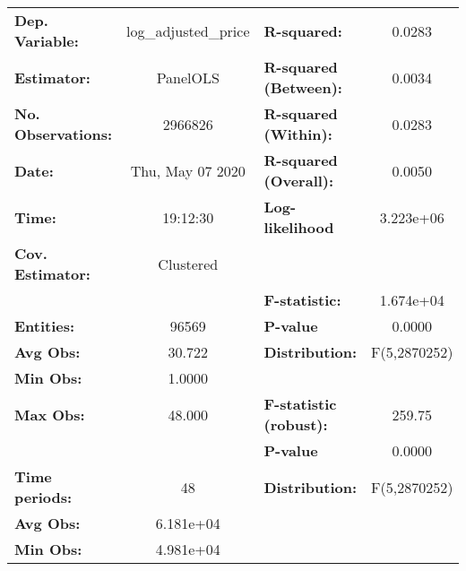 \documentclass{report}
\begin{document}
\begin{center}
\begin{tabular}{lclc}
\toprule
\textbf{Dep. Variable:}                          & log\_adjusted\_price & \textbf{  R-squared:         }   &      0.0283      \\
\textbf{Estimator:}                              &       PanelOLS       & \textbf{  R-squared (Between):}  &      0.0034      \\
\textbf{No. Observations:}                       &       2966826        & \textbf{  R-squared (Within):}   &      0.0283      \\
\textbf{Date:}                                   &   Thu, May 07 2020   & \textbf{  R-squared (Overall):}  &      0.0050      \\
\textbf{Time:}                                   &       19:12:30       & \textbf{  Log-likelihood     }   &    3.223e+06     \\
\textbf{Cov. Estimator:}                         &      Clustered       & \textbf{                     }   &                  \\
\textbf{}                                        &                      & \textbf{  F-statistic:       }   &    1.674e+04     \\
\textbf{Entities:}                               &        96569         & \textbf{  P-value            }   &      0.0000      \\
\textbf{Avg Obs:}                                &        30.722        & \textbf{  Distribution:      }   &   F(5,2870252)   \\
\textbf{Min Obs:}                                &        1.0000        & \textbf{                     }   &                  \\
\textbf{Max Obs:}                                &        48.000        & \textbf{  F-statistic (robust):} &      259.75      \\
\textbf{}                                        &                      & \textbf{  P-value            }   &      0.0000      \\
\textbf{Time periods:}                           &          48          & \textbf{  Distribution:      }   &   F(5,2870252)   \\
\textbf{Avg Obs:}                                &      6.181e+04       & \textbf{                     }   &                  \\
\textbf{Min Obs:}                                &      4.981e+04       & \textbf{                     }   &                  \\

\end{tabular}
\end{center}
\end{document}
